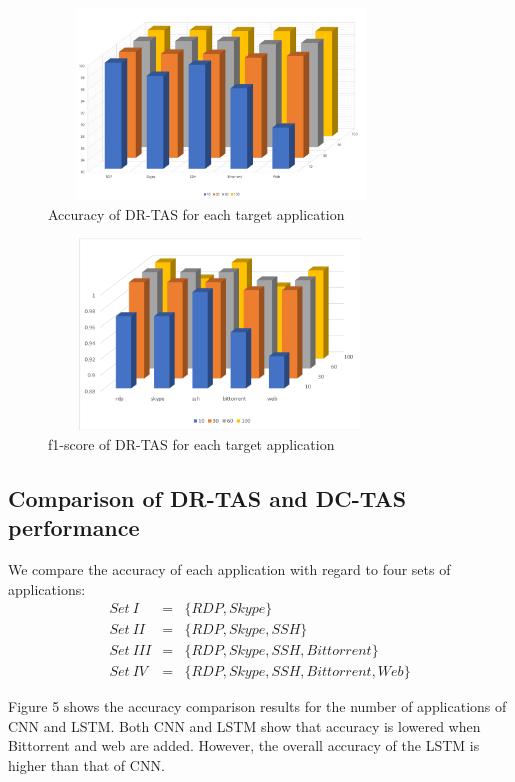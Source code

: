 \documentclass[10pt, twoside, jounal]{IEEEtran}
\begin{document}
\begin{figure}[!t]
\centering
\setlength{\abovecaptionskip}{0pt}
\setlength{\belowcaptionskip}{0pt}
{
\includegraphics[width=3.6in, height=2.0in]{fig4.jpg}
\caption{Accuracy of DR-TAS for each target application}
\label{fig4}
}
\end{figure}

\begin{figure}[!t]
\centering
\setlength{\abovecaptionskip}{0pt}
\setlength{\belowcaptionskip}{0pt}
{
\includegraphics[width=3.6in, height=2.0in]{fig5.png}
\caption{f1-score of DR-TAS for each target application}
\label{fig5}
}
\end{figure}

\subsection{Comparison of DR-TAS and DC-TAS performance}
We compare the accuracy of each application with regard to four sets of applications:
\begin{eqnarray}
    Set~I&=&\{RDP, Skype\} \\
    Set~II&=&\{RDP, Skype, SSH\} \\
    Set~III&=&\{RDP, Skype, SSH, Bittorrent\} \\
    Set~IV&=&\{RDP, Skype, SSH, Bittorrent, Web\}
\end{eqnarray}

Figure 5 shows the accuracy comparison results for the number of applications of CNN and LSTM.
Both CNN and LSTM show that accuracy is lowered when Bittorrent and web are added.
However, the overall accuracy of the LSTM is higher than that of CNN.
\end{document}
